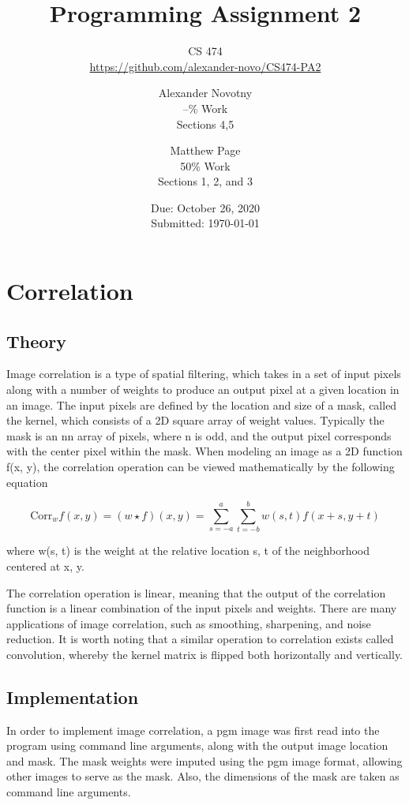 \documentclass[headings=optiontoheadandtoc,listof=totoc,parskip=full]{scrartcl}
\title{Programming Assignment 2}
\subtitle{CS 474\\\url{https://github.com/alexander-novo/CS474-PA2}}
\author{Alexander Novotny\\--\% Work\\Sections 4,5 \and Matthew Page\\50\% Work\\Sections 1, 2, and 3}
\date{Due: October 26, 2020 \\ Submitted: \today}
\begin{document}
\maketitle
\tableofcontents
{}

\newpage
{}

\section{Correlation}
\label{sec:correlation}

\subsection{Theory}

Image correlation is a type of spatial filtering, which takes in a set of input pixels along with a number of weights to produce an output pixel at a given location in an image. The input pixels are defined by the location and size of a mask, called the kernel, which consists of a 2D square array of weight values. Typically the mask is an nn array of pixels, where n is odd, and the output pixel corresponds with the center pixel within the mask. When modeling an image as a 2D function f(x, y), the correlation operation can be viewed mathematically by the following equation

\[\text{Corr}_w f(x, y) = (w \star f)(x, y) = \sum_{s=-a}^a \sum_{t=-b}^b w(s, t) f(x+s, y+t)\]

where w(s, t) is the weight at the relative location s, t of the neighborhood centered at x, y.

The correlation operation is linear, meaning that the output of the correlation function is a linear combination of the input pixels and weights. There are many applications of image correlation, such as smoothing, sharpening, and noise reduction. It is worth noting that a similar operation to correlation exists called convolution, whereby the kernel matrix is flipped both horizontally and vertically. 


\subsection{Implementation}

In order to implement image correlation, a pgm image was first read into the program using command line arguments, along with the output image location and mask. The mask weights were imputed using the pgm image format, allowing other images to serve as the mask. Also, the dimensions of the mask are taken as command line arguments. 
\end{document}
